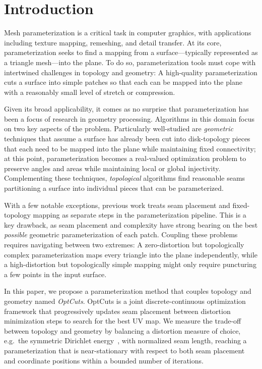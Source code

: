 
\section{Introduction}
Mesh parameterization is a critical task in computer graphics, with applications including texture mapping, remeshing, and detail transfer.  At its core, parameterization seeks to find a mapping from a surface---typically represented as a triangle mesh---into the plane.  To do so, parameterization tools must cope with intertwined challenges in topology and geometry:  A high-quality parameterization cuts a surface into simple %
patches so that each can be mapped into the plane with a reasonably small level of stretch or compression.

Given its broad applicability, it comes as no surprise that parameterization has been a focus of research in geometry processing.  Algorithms in this domain focus on two key aspects of the problem.  Particularly well-studied are \emph{geometric} techniques that assume a surface has already been cut into disk-topology pieces that each need to be mapped into the plane while maintaining fixed connectivity; at this point, parameterization becomes a real-valued optimization problem to preserve angles and areas while maintaining local or global injectivity. Complementing these techniques, \emph{topological} algorithms find reasonable seams partitioning a surface into individual pieces that can be parameterized.  

With a few notable exceptions, previous work treats seam placement and fixed-topology mapping as separate steps in the parameterization pipeline.  This is a key drawback, as seam placement and complexity have strong bearing on the best \emph{possible} geometric parameterization of each patch.  Coupling these problems requires navigating between two extremes:  A zero-distortion but topologically complex parameterization maps every triangle into the plane independently, while a high-distortion but topologically simple mapping might only require puncturing a few points in the input surface.

In this paper, we propose a parameterization method that couples topology and geometry named 
{\em OptCuts}.
OptCuts is 
a joint discrete-continuous optimization framework that progressively updates seam placement between distortion minimization steps to search for the best UV map. 
%
We measure the trade-off between topology and geometry by balancing a distortion measure of choice, e.g.\ the symmetric Dirichlet energy~\cite{Smith2015Bijective}, with normalized seam length, reaching a parameterization that is near-stationary with respect to both seam placement and coordinate positions within a bounded number of iterations.

